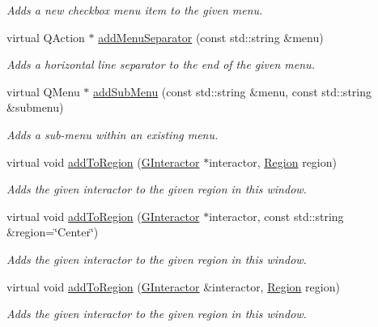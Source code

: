\begin{DoxyCompactItemize}
\begin{DoxyCompactList}\small\item\em Adds a new checkbox menu item to the given menu. \end{DoxyCompactList}\item 
virtual Q\+Action $\ast$ \mbox{\hyperlink{classGWindow_abdf4f167a7135e31ecb8f3363fddfd19}{add\+Menu\+Separator}} (const std\+::string \&menu)
\begin{DoxyCompactList}\small\item\em Adds a horizontal line separator to the end of the given menu. \end{DoxyCompactList}\item 
virtual Q\+Menu $\ast$ \mbox{\hyperlink{classGWindow_a557f7b2372831420546b73239027d2ae}{add\+Sub\+Menu}} (const std\+::string \&menu, const std\+::string \&submenu)
\begin{DoxyCompactList}\small\item\em Adds a sub-\/menu within an existing menu. \end{DoxyCompactList}\item 
virtual void \mbox{\hyperlink{classGWindow_aab55413917cdbb2e0560ab415d59fd1f}{add\+To\+Region}} (\mbox{\hyperlink{classGInteractor}{G\+Interactor}} $\ast$interactor, \mbox{\hyperlink{classGWindow_a81a01a86de31071a92e6cce0bab9bc4b}{Region}} region)
\begin{DoxyCompactList}\small\item\em Adds the given interactor to the given region in this window. \end{DoxyCompactList}\item 
virtual void \mbox{\hyperlink{classGWindow_a9c8e600889001e6e72d3548918a6baff}{add\+To\+Region}} (\mbox{\hyperlink{classGInteractor}{G\+Interactor}} $\ast$interactor, const std\+::string \&region=\char`\"{}Center\char`\"{})
\begin{DoxyCompactList}\small\item\em Adds the given interactor to the given region in this window. \end{DoxyCompactList}\item 
virtual void \mbox{\hyperlink{classGWindow_ad05df0d92ab2fba95d401a5614365558}{add\+To\+Region}} (\mbox{\hyperlink{classGInteractor}{G\+Interactor}} \&interactor, \mbox{\hyperlink{classGWindow_a81a01a86de31071a92e6cce0bab9bc4b}{Region}} region)
\begin{DoxyCompactList}\small\item\em Adds the given interactor to the given region in this window. \end{DoxyCompactList}\item 

\end{DoxyCompactItemize}
